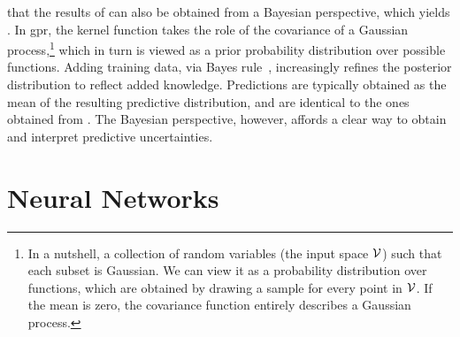  that the results of \krr can also be obtained from a Bayesian perspective, which yields . In \gls{gpr}, the kernel function takes the role of the covariance of a Gaussian process,\footnote{
	In a nutshell, a collection of random variables (the input space $\mathcal{V}$) such that each subset is Gaussian. We can view it as a probability distribution over functions, which are obtained by drawing a sample for every point in $\mathcal{V}$. If the mean is zero, the covariance function entirely describes a Gaussian process.
} which in turn is viewed as a prior probability distribution over possible functions.
Adding training data, via Bayes rule~\cite{b1763m}, increasingly refines the posterior distribution to reflect added knowledge.
Predictions are typically obtained as the mean of the resulting predictive distribution, and are identical to the ones obtained from \krr. The Bayesian perspective, however, affords a clear way to obtain and interpret predictive uncertainties.

\section{Neural Networks}
\label{sec:ml-nns}

